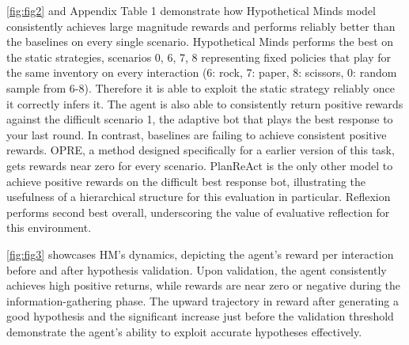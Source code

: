 \documentclass{article} %
\begin{document}
\autoref{fig:fig2} and Appendix Table 1 demonstrate how Hypothetical Minds model consistently achieves large magnitude rewards and performs reliably better than the baselines on every single scenario. Hypothetical Minds performs the best on the static strategies, scenarios 0, 6, 7, 8 representing fixed policies that play for the same inventory on every interaction (6: rock, 7: paper, 8: scissors, 0: random sample from 6-8). Therefore it is able to exploit the static strategy reliably once it correctly infers it. The agent is also able to consistently return positive rewards against the difficult scenario 1, the adaptive bot that plays the best response to your last round. In contrast, baselines are failing to achieve consistent positive rewards. OPRE, a method designed specifically for a earlier version of this task, gets rewards near zero for every scenario. PlanReAct is the only other model to achieve positive rewards on the difficult best response bot, illustrating the usefulness of a hierarchical structure for this evaluation in particular. Reflexion performs second best overall, underscoring the value of evaluative reflection for this environment.

\autoref{fig:fig3} showcases HM's dynamics, depicting the agent's reward per interaction before and after hypothesis validation. Upon validation, the agent consistently achieves high positive returns, while rewards are near zero or negative during the information-gathering phase. The upward trajectory in reward after generating a good hypothesis and the significant increase just before the validation threshold demonstrate the agent's ability to exploit accurate hypotheses effectively.

\end{document}
